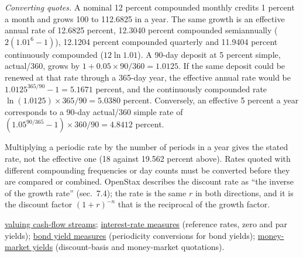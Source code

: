 \begin{qfdefinition}
\emph{Converting quotes.} A nominal 12 percent compounded monthly credits 1 percent a month and grows 100 to 112.6825 in a year. The same growth is an effective annual rate of 12.6825 percent, 12.3040 percent compounded semiannually ($2(1.01^6-1)$), 12.1204 percent compounded quarterly and 11.9404 percent continuously compounded ($12\ln1.01$). A 90-day deposit at 5 percent simple, actual/360, grows by $1+0.05\times90/360=1.0125$. If the same deposit could be renewed at that rate through a 365-day year, the effective annual rate would be $1.0125^{365/90}-1=5.1671$ percent, and the continuously compounded rate $\ln(1.0125)\times365/90=5.0380$ percent. Conversely, an effective 5 percent a year corresponds to a 90-day actual/360 simple rate of $(1.05^{90/365}-1)\times360/90=4.8412$ percent.

 Multiplying a periodic rate by the number of periods in a year gives the stated rate, not the effective one (18 against 19.562 percent above). Rates quoted with different compounding frequencies or day counts must be converted before they are compared or combined. OpenStax describes the discount rate as ``the inverse of the growth rate'' (sec.~7.4); the rate is the same $r$ in both directions, and it is the discount factor $(1+r)^{-n}$ that is the reciprocal of the growth factor.

 \hyperref[meth:cash-flow-streams]{valuing cash-flow streams}; \hyperref[def:interest-rate-measures]{interest-rate measures} (reference rates, zero and par yields); \hyperref[def:bond-yield-spread-measures]{bond yield measures} (periodicity conversions for bond yields); \hyperref[meth:floating-money-market-yields]{money-market yields} (discount-basis and money-market quotations).

\end{qfdefinition}

